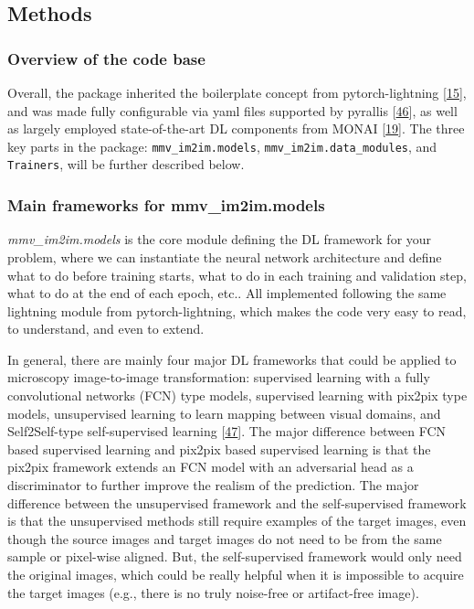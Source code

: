 \hypertarget{methods}{%
\subsection{Methods}\label{methods}}

\hypertarget{overview-of-the-code-base}{%
\subsubsection{Overview of the code base}\label{overview-of-the-code-base}}

Overall, the package inherited the boilerplate concept from pytorch-lightning {[}\protect\hyperlink{ref-YbvSvdyB}{15}{]}, and was made fully configurable via yaml files supported by pyrallis {[}\protect\hyperlink{ref-17WhsEZko}{46}{]}, as well as largely employed state-of-the-art DL components from MONAI {[}\protect\hyperlink{ref-UU62HYC6}{19}{]}. The three key parts in the package: \texttt{mmv\_im2im.models}, \texttt{mmv\_im2im.data\_modules}, and \texttt{Trainers}, will be further described below.

\hypertarget{main-frameworks-for-mmv_im2im.models}{%
\subsubsection{Main frameworks for mmv\_im2im.models}\label{main-frameworks-for-mmv_im2im.models}}

\emph{mmv\_im2im.models} is the core module defining the DL framework for your problem, where we can instantiate the neural network architecture and define what to do before training starts, what to do in each training and validation step, what to do at the end of each epoch, etc.. All implemented following the same lightning module from pytorch-lightning, which makes the code very easy to read, to understand, and even to extend.

In general, there are mainly four major DL frameworks that could be applied to microscopy image-to-image transformation: supervised learning with a fully convolutional networks (FCN) type models, supervised learning with pix2pix type models, unsupervised learning to learn mapping between visual domains, and Self2Self-type self-supervised learning {[}\protect\hyperlink{ref-tuObtXMR}{47}{]}. The major difference between FCN based supervised learning and pix2pix based supervised learning is that the pix2pix framework extends an FCN model with an adversarial head as a discriminator to further improve the realism of the prediction. The major difference between the unsupervised framework and the self-supervised framework is that the unsupervised methods still require examples of the target images, even though the source images and target images do not need to be from the same sample or pixel-wise aligned. But, the self-supervised framework would only need the original images, which could be really helpful when it is impossible to acquire the target images (e.g., there is no truly noise-free or artifact-free image).

